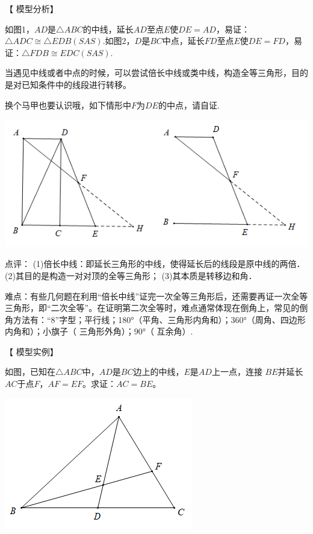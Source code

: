 \documentclass[10pt]{ctexart}
\begin{document}
【 {\heiti 模型分析}】

如图1，$AD$是$\triangle ABC$的中线，延长$AD$至点$E$使$DE=AD$，易证：$\triangle ADC\cong \triangle EDB(SAS)$.如图2，$D$是$BC$中点，延长$FD$至点$E$使$DE=FD$，易证：$\triangle FDB\cong EDC(SAS)$.

当遇见中线或者中点的时候，可以尝试倍长中线或类中线，构造全等三角形，目的是对已知条件中的线段进行转移。

换个马甲也要认识哦，如下情形中$F$为$DE$的中点，请自证.

\begin{center}
	\includegraphics[scale=0.6]{figure/zhongdian03}
\end{center}

点评：
(1)倍长中线：即延长三角形的中线，使得延长后的线段是原中线的两倍．
(2)其目的是构造一对对顶的全等三角形；
(3)其本质是转移边和角．



难点：有些几何题在利用“倍长中线”证完一次全等三角形后，还需要再证一次全等三角形，即“二次全等”。在证明第二次全等时，难点通常体现在倒角上，常见的倒角方法有：“8”字型；平行线；180°（平角、三角形内角和）；360°（周角、四边形内角和）；小旗子（ 三角形外角）；90°（ 互余角）.


【 {\heiti 模型实例}】
\begin{shaded}
	\begin{example}
 	如图，已知在$\triangle ABC$中，$AD$是$BC$边上的中线，$E$是$AD$上一点，连接 $BE$并延长$AC$于点$F$，$AF=EF$。求证：$AC=BE$。
	\end{example}
\end{shaded}

\begin{flushright}
	\includegraphics[scale=0.6]{figure/zhongdian04}
\end{flushright}
\end{document}
